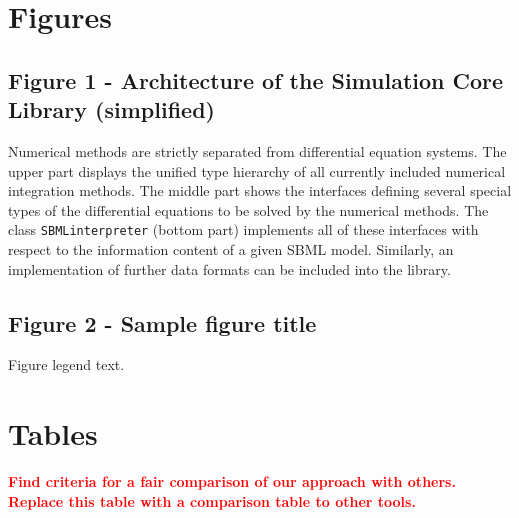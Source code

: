 \documentclass[10pt]{bmc_article}
\newenvironment{bmcformat}{\baselineskip20pt\sloppy\setboolean{publ}{false}}{\baselineskip20pt\sloppy}
\newcommand{\TODO}[1]{\textcolor{red}{\textbf{#1}}}
\newcommand{\SBMLinterpreter}{\texttt{SBML\-interpreter}}
\begin{document}
\begin{bmcformat}


\section*{Figures}
  \subsection*{Figure 1 - Architecture of the Simulation Core Library
  (simplified)}
  
Numerical methods are strictly separated from differential equation systems. The
upper part displays the unified type hierarchy of all currently included numerical integration
methods. The middle part shows the interfaces defining several
special types of the differential equations to be solved by the numerical
methods.
The class \SBMLinterpreter{} (bottom part) implements all of these interfaces
with respect to the information content of a given SBML model. Similarly, an
implementation of further data formats can be included into the
library.

  \subsection*{Figure 2 - Sample figure title}
      Figure legend text.




\section*{Tables}

\TODO{Find criteria for a fair comparison of our approach with others.}
\TODO{Replace this table with a comparison table to other tools.}


\end{bmcformat}
\end{document}

